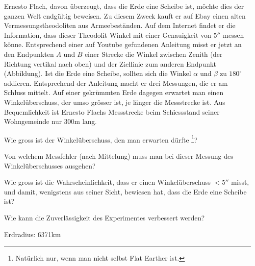 Ernesto Flach, davon überzeugt, dass die Erde eine Scheibe ist,
möchte dies der ganzen Welt endgültig beweisen.
Zu diesem Zweck kauft er auf Ebay einen alten Vermessungstheodoliten
aus Armeebeständen.
Auf dem Internet findet er die Information, dass dieser Theodolit Winkel
mit einer Genauigkeit von $5''$ messen könne.
Entsprechend einer auf Youtube gefundenen Anleitung misst er jetzt an
den Endpunkten $A$ und $B$ einer Strecke die Winkel zwischen Zenith
(der Richtung vertikal nach oben) und der Ziellinie zum anderen Endpunkt
(Abbildung).
Ist die Erde eine Scheibe, sollten sich die Winkel $\alpha$
und $\beta$ zu $180^\circ$
addieren.
Entsprechend der Anleitung macht er drei Messungen, die er am Schluss 
mittelt.
Auf einer gekrümmten Erde dagegen erwartet man einen Winkelüberschuss,
der umso grösser ist, je länger die Messstrecke ist.
Aus Bequemlichkeit ist Ernesto Flachs Messstrecke beim Schiessstand
seiner Wohngemeinde nur 300m lang.
\begin{center}
\end{center}

\begin{teilaufgaben}
\item
Wie gross ist der Winkelüberschuss, den man erwarten dürfte%
\footnote{Natürlich nur, wenn man nicht selbst Flat Earther ist.}?
\item
Von welchem Messfehler (nach Mittelung) muss man bei dieser Messung
des Winkelüberschusses ausgehen?
\item
Wie gross ist die Wahrscheinlichkeit, dass er einen Winkelüberschuss $<5''$
misst, und damit, wenigstens aus seiner Sicht, bewiesen hat, dass
die Erde eine Scheibe ist?
\item 
Wie kann die Zuverlässigkeit des Experimentes verbessert werden?
\end{teilaufgaben}

\begin{hinweis}
Erdradius: 6371km
\end{hinweis}

